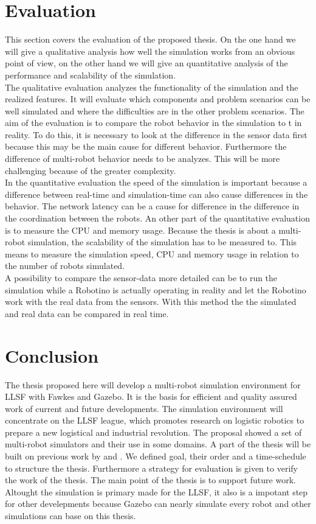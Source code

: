 \documentclass[11pt,a4paper,titlepage]{article}
\begin{document}
\section{Evaluation}
This section covers the evaluation of the proposed thesis. On the one hand we will give a qualitative analysis how well the simulation works from an obvious point of view, on the other hand we will give an quantitative analysis of the performance and scalability of the simulation.\\
The qualitative evaluation analyzes the functionality of the simulation and the realized features. It will evaluate which components and problem scenarios can be well simulated and where the difficulties are in the other problem scenarios. The aim of the evaluation is to compare the robot behavior in the simulation to t in reality. To do this, it is necessary to look at the difference in the sensor data first because this may be the main cause for different behavior. Furthermore the difference of multi-robot behavior needs to be analyzes. This will be more challenging because of the greater complexity.\\
In the quantitative evaluation the speed of the simulation is important because a difference between real-time and simulation-time can also cause differences in the behavior. The network latency can be a cause for difference in the difference in the coordination between the robots. An other part of the quantitative evaluation is to measure the CPU and memory usage. Because the thesis is about a multi-robot simulation, the scalability of the simulation has to be measured to. This means to measure the simulation speed, CPU and memory usage in relation to the number of robots simulated.\\
A possibility to compare the sensor-data more detailed can be to run the simulation while a Robotino is actually operating in reality and let the Robotino work with the real data from the sensors. With this method the the simulated and real data can be compared in real time.

\section{Conclusion}
The thesis proposed here will develop a multi-robot simulation environment for LLSF with Fawkes and Gazebo. It is the basis for efficient and quality assured work of current and future developments. The simulation environment will concentrate on the LLSF league, which promotes research on logistic robotics to prepare a new logistical and industrial revolution. The proposal showed a set of multi-robot simulators and their use in some domains. A part of the thesis will be built on previous work by \cite{KlingenDA} and \cite{MultiLevelAbstraction}. We defined goal, their order and a time-schedule to structure the thesis. Furthermore a strategy for evaluation is given to verify the work of the thesis. The main point of the thesis is to support future work. Altought the simulation is primary made for the LLSF, it also is a impotant step for other develepments because Gazebo can nearly simulate every robot and other simulations can base on this thesis.




\end{document}
